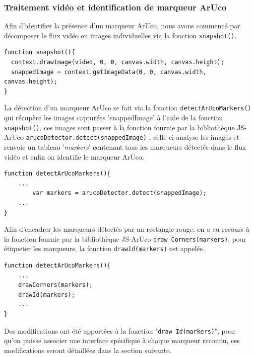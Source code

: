 \documentclass[12pt,a4paper]{article}
\begin{document}
\subsubsection*{Traitement vidéo et identification de marqueur ArUco}

	Afin d'identifier la présence d'un marqueur ArUco, nous avons commencé par décomposer le flux vidéo en images individuelles via la fonction \texttt{snapshot()}.
\begin{lstlisting}
function snapshot(){
  context.drawImage(video, 0, 0, canvas.width, canvas.height);
  snappedImage = context.getImageData(0, 0, canvas.width, canvas.height); 
}
\end{lstlisting}

	La détection d'un marqueur ArUco se fait via la fonction \texttt{detectArUcoMarkers()} qui récupère les images capturées 'snappedImage' à l'aide de la fonction \texttt{snapshot()}, ces images sont passer à la fonction fournie par la bibliothèque JS-ArUco \texttt{arucoDetector.detect(snappedImage)} , celle-ci analyse les images et renvoie un tableau '\textit{markers}'  contenant tous les marqueurs détectés dans le flux vidéo et enfin on identifie le marqueur ArUco. 
\begin{lstlisting}
function detectArUcoMarkers(){
  	...
    	var markers = arucoDetector.detect(snappedImage);
  	...
}
\end{lstlisting}
\par
   Afin d'encadrer les marqueurs détectés par un rectangle rouge, on a eu recours à la fonction fournie par la bibliothèque JS-ArUco \texttt{draw Corners(markers)}, pour  étiqueter les marqueurs, la fonction \texttt{drawId(markers)} est appelée.
\begin{lstlisting}
function detectArUcoMarkers(){
	...
    drawCorners(markers);
    drawId(markers);
    ...
}
\end{lstlisting}

Des modifications ont été apportées à la fonction "\texttt{draw Id(markers)}", pour qu'on puisse associer une interface spécifique à chaque marqueur reconnu, ces modifications seront détaillées dans la section suivante.

\end{document}
